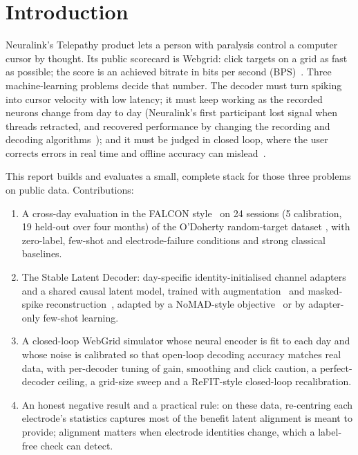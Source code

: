 \documentclass[10pt,twocolumn]{article}
\begin{document}
\section{Introduction}
Neuralink's Telepathy product lets a person with paralysis control a computer cursor by
thought. Its public scorecard is Webgrid: click targets on a grid as fast as possible; the
score is an achieved bitrate in bits per second (BPS)~\cite{neuralinkwebgrid}. Three
machine-learning problems decide that number. The decoder must turn spiking into cursor
velocity with low latency; it must keep working as the recorded neurons change from day to
day (Neuralink's first participant lost signal when threads retracted, and recovered
performance by changing the recording and decoding algorithms~\cite{neuralink2024prime});
and it must be judged in closed loop, where the user corrects errors in real time and
offline accuracy can mislead~\cite{gilja2012refit,cunningham2011closed,willett2019principled}.

This report builds and evaluates a small, complete stack for those three problems on public
data. Contributions:
\begin{enumerate}
\item A cross-day evaluation in the FALCON style~\cite{karpowicz2024falcon} on 24 sessions
(5 calibration, 19 held-out over four months) of the O'Doherty random-target dataset
\cite{odoherty2017data}, with zero-label, few-shot and electrode-failure conditions and
strong classical baselines.
\item The Stable Latent Decoder: day-specific identity-initialised channel adapters and a
shared causal latent model, trained with augmentation~\cite{sussillo2016making} and
masked-spike reconstruction~\cite{ye2021ndt}, adapted by a NoMAD-style
objective~\cite{karpowicz2025nomad} or by adapter-only few-shot learning.
\item A closed-loop WebGrid simulator whose neural encoder is fit to each day and whose noise
is calibrated so that open-loop decoding accuracy matches real data, with per-decoder
tuning of gain, smoothing and click caution, a perfect-decoder ceiling, a grid-size sweep
and a ReFIT-style closed-loop recalibration.
\item An honest negative result and a practical rule: on these data, re-centring each
electrode's statistics captures most of the benefit latent alignment is meant to provide;
alignment matters when electrode identities change, which a label-free check can detect.
\end{enumerate}
\end{document}
